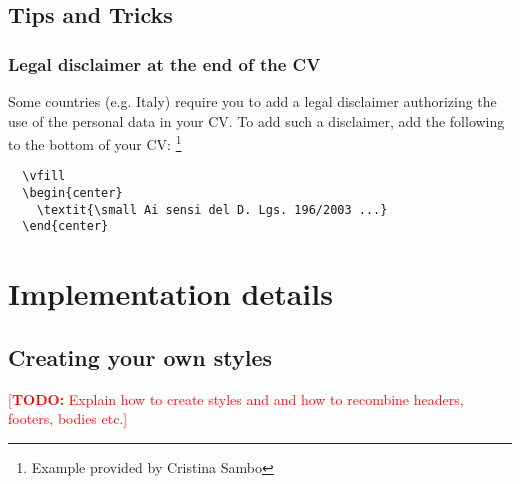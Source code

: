 \documentclass[a4paper, 11pt]{article}
\newcommand{\todox}[1]{\textcolor{red}{[\textbf{TODO:} #1]}}
\begin{document}
\subsection{Tips and Tricks}
\subsubsection{Legal disclaimer at the end of the CV}
Some countries (e.g. Italy) require you to add a legal disclaimer authorizing the use of the personal data in your CV.
To add such a disclaimer, add the following to the bottom of your CV:%
\footnote{Example provided by Cristina Sambo}%
\begin{lstlisting}
  \vfill
  \begin{center}
    \textit{\small Ai sensi del D. Lgs. 196/2003 ...}
  \end{center}
\end{lstlisting}



\section{Implementation details}
\label{section:implementationDetails}

\subsection{Creating your own styles}
\todox{Explain how to create styles and and how to recombine headers, footers, bodies etc.}
\end{document}
